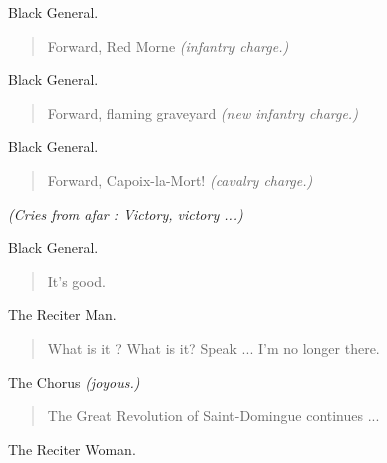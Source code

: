 \documentclass[letterpaper,article,12pt,oneside,notitlepage]{memoir}
\begin{document}
\begin{center}Black General.\end{center}

\begin{verse}
Forward, Red Morne \textit{(infantry charge.)} \\
\end{verse}

\begin{center}Black General.\end{center}

\begin{verse}
Forward, flaming graveyard \textit{(new infantry charge.)} \\
\end{verse}

\begin{center}Black General.\end{center}

\begin{verse}
Forward, Capoix-la-Mort! \textit{(cavalry charge.)} \\
\end{verse}

\textit{(Cries from afar : Victory, victory ...)}

\begin{center}Black General.\end{center}

\begin{verse}
It's good. \\
\end{verse}

\begin{center}The Reciter Man.\end{center}

\begin{verse}
\hspace{1cm} What is it ? What is it? Speak ... I'm no longer there. \\
\end{verse}

\begin{center}The Chorus \textit{(joyous.)}\end{center}

\begin{verse}
The Great Revolution of Saint-Domingue continues ... \\
\end{verse}

\begin{center}The Reciter Woman.\end{center}
\end{document}
